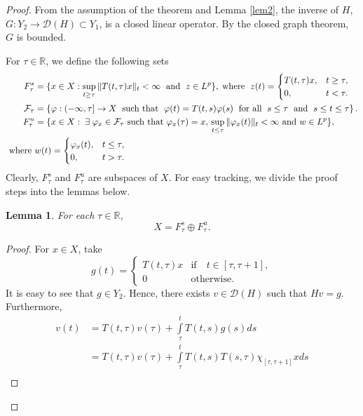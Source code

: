 \documentclass[reqno]{amsart}
\newtheorem{lemma}{Lemma}[section]
\def\r{\mathbb{R}}
\begin{document}
\begin{proof}
From the assumption of the theorem and Lemma \ref{lem2}, the inverse of $H$, $G:Y_2 \rightarrow \mathcal{D}(H) \subset Y_1$, is a closed linear operator. By the closed graph theorem, $G$ is bounded. 

For $\tau \in \mathbb{R}$, we define the following sets
\begin{align*}
F^{s}_{\tau}&=\{ x\in X :  \sup_{t\ge \tau}\|T(t,\tau)x\|_t <\infty \; \text{ and }\; z\in L^p \}, \; \text{where }\; z(t)=
\begin{cases}
T(t,\tau)x,& t\ge \tau,\\
0,&t<\tau.
\end{cases} \\ 
\mathcal{F}_{\tau}&=\left\{ \varphi: (-\infty, \tau] \to X  \; \text{ such that } \; \varphi(t)=T(t,s)\varphi(s) \; \text{ for all } \; s\le \tau \; \text{ and } \; s\le t\le \tau \right\}. \cr
F^{u}_{\tau}&=\{ x\in X :  \; \exists \; \varphi_x \in \mathcal{F}_{\tau}  \text{ such that }  \varphi_x(\tau)=x, \,   
\sup_{t \le \tau}\|\varphi_x(t)\|_t <\infty  \text{ and } w\in L^p\},\label{fu} \\
\text{ where }&
 w(t)=
\begin{cases}
\varphi_x(t),& t\le \tau,\\
0,&t>\tau.
\end{cases} \notag
\end{align*}
Clearly, $F^s_{\tau}$ and $ F_{\tau}^u$ are subspaces of $X$. For easy tracking, we divide the proof steps into the lemmas below.
\begin{lemma} \label{lem}
For each $\tau \in \r$,
\begin{equation}
X=F_{\tau}^s \oplus F_{\tau}^u. \label{2.15}
\end{equation}
\end{lemma}
\begin{proof}
For $x\in X$, take
$$
 g(t)=
 \begin{cases}
 T(t,\tau)x& \text{if}\quad t \in [\tau ,\tau +1],\\
 0 & \text{otherwise}. 
 \end{cases}
 $$
 It is easy to see that $g \in Y_2$. Hence, there exists $v \in \mathcal{D}(H)$ such that $Hv=g$. Furthermore,
 \begin{align*}
 v(t)&=T(t,\tau)v(\tau)+\displaystyle\int\limits_{\tau}^{t}T(t,s)g(s)ds\\
 &=T(t,\tau)v(\tau)+\displaystyle\int\limits_{\tau}^{t}T(t,s)T(s,\tau)\chi_{[\tau, \tau+1]} x ds\\

\end{align*}
\end{proof}
\end{proof}
\end{document}
